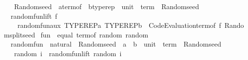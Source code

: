 \begin{isabellebody}
\ \ {\isasymRightarrow}\ Random{\isachardot}{\kern0pt}seed\ {\isasymRightarrow}\ {\isacharparenleft}{\kern0pt}{\isacharparenleft}{\kern0pt}{\isacharprime}{\kern0pt}a{\isacharcolon}{\kern0pt}{\isacharcolon}{\kern0pt}term{\isacharunderscore}{\kern0pt}of\ {\isasymRightarrow}\ {\isacharprime}{\kern0pt}b{\isacharcolon}{\kern0pt}{\isacharcolon}{\kern0pt}typerep{\isacharparenright}{\kern0pt}\ {\isasymtimes}\ {\isacharparenleft}{\kern0pt}unit\ {\isasymRightarrow}\ term{\isacharparenright}{\kern0pt}{\isacharparenright}{\kern0pt}\ {\isasymtimes}\ Random{\isachardot}{\kern0pt}seed{\isachardoublequoteclose}\isanewline
{}\isanewline
\ \ {\isachardoublequoteopen}random{\isacharunderscore}{\kern0pt}fun{\isacharunderscore}{\kern0pt}lift\ f\ {\isacharequal}{\kern0pt}\isanewline
\ \ \ \ random{\isacharunderscore}{\kern0pt}fun{\isacharunderscore}{\kern0pt}aux\ TYPEREP{\isacharparenleft}{\kern0pt}{\isacharprime}{\kern0pt}a{\isacharparenright}{\kern0pt}\ TYPEREP{\isacharparenleft}{\kern0pt}{\isacharprime}{\kern0pt}b{\isacharparenright}{\kern0pt}\ {\isacharparenleft}{\kern0pt}{\isacharequal}{\kern0pt}{\isacharparenright}{\kern0pt}\ Code{\isacharunderscore}{\kern0pt}Evaluation{\isachardot}{\kern0pt}term{\isacharunderscore}{\kern0pt}of\ f\ Random{\isachardot}{\kern0pt}split{\isacharunderscore}{\kern0pt}seed{\isachardoublequoteclose}\isanewline
\isanewline
{}\isamarkupfalse%
\ {\isachardoublequoteopen}fun{\isachardoublequoteclose}\ {\isacharcolon}{\kern0pt}{\isacharcolon}{\kern0pt}\ {\isacharparenleft}{\kern0pt}{\isachardoublequoteopen}{\isacharbraceleft}{\kern0pt}equal{\isacharcomma}{\kern0pt}\ term{\isacharunderscore}{\kern0pt}of{\isacharbraceright}{\kern0pt}{\isachardoublequoteclose}{\isacharcomma}{\kern0pt}\ random{\isacharparenright}{\kern0pt}\ random\isanewline
{}\isanewline
\isanewline
{}\isamarkupfalse%
\isanewline
\ \ random{\isacharunderscore}{\kern0pt}fun\ {\isacharcolon}{\kern0pt}{\isacharcolon}{\kern0pt}\ {\isachardoublequoteopen}natural\ {\isasymRightarrow}\ Random{\isachardot}{\kern0pt}seed\ {\isasymRightarrow}\ {\isacharparenleft}{\kern0pt}{\isacharparenleft}{\kern0pt}{\isacharprime}{\kern0pt}a\ {\isasymRightarrow}\ {\isacharprime}{\kern0pt}b{\isacharparenright}{\kern0pt}\ {\isasymtimes}\ {\isacharparenleft}{\kern0pt}unit\ {\isasymRightarrow}\ term{\isacharparenright}{\kern0pt}{\isacharparenright}{\kern0pt}\ {\isasymtimes}\ Random{\isachardot}{\kern0pt}seed{\isachardoublequoteclose}\isanewline
\ \ \ {\isachardoublequoteopen}random\ i\ {\isacharequal}{\kern0pt}\ random{\isacharunderscore}{\kern0pt}fun{\isacharunderscore}{\kern0pt}lift\ {\isacharparenleft}{\kern0pt}random\ i{\isacharparenright}{\kern0pt}{\isachardoublequoteclose}\isanewline

\end{isabellebody}
